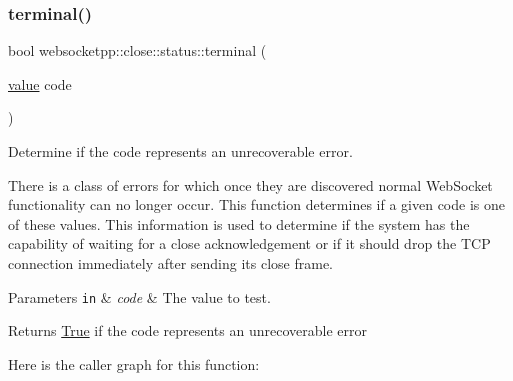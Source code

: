 \subsubsection{\texorpdfstring{terminal()}{terminal()}}
{\footnotesize\ttfamily bool websocketpp\+::close\+::status\+::terminal (\begin{DoxyParamCaption}\item[{\mbox{\hyperlink{namespacewebsocketpp_1_1close_1_1status_a8614a5c4733d708e2d2a32191c5bef84}{value}}}]{code }\end{DoxyParamCaption})\hspace{0.3cm}{\ttfamily [inline]}}



Determine if the code represents an unrecoverable error. 

There is a class of errors for which once they are discovered normal Web\+Socket functionality can no longer occur. This function determines if a given code is one of these values. This information is used to determine if the system has the capability of waiting for a close acknowledgement or if it should drop the T\+CP connection immediately after sending its close frame.


\begin{DoxyParams}[1]{Parameters}
\mbox{\tt in}  & {\em code} & The value to test. \\
\hline
\end{DoxyParams}
\begin{DoxyReturn}{Returns}
\mbox{\hyperlink{struct_true}{True}} if the code represents an unrecoverable error 
\end{DoxyReturn}
Here is the caller graph for this function\+:
